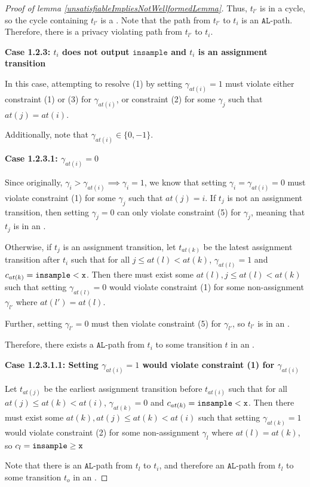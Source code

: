 \begin{proof}[Proof of lemma \ref{unsatisfiableImpliesNotWellformedLemma}]
    Thus, $t_{l'}$ is in a cycle, so the cycle containing $t_{l'}$ is a \gcycle. Note that the path from $t_{l'}$ to $t_i$ is an $\texttt{AL}$-path. Therefore, there is a privacy violating path from $t_{l'}$ to $t_i$.

    \textbf{Case 1.2.3: $t_i$ does not output $\texttt{insample}$ and $t_i$ is an assignment transition}

    In this case, attempting to resolve (1) by setting $\gamma_{at(i)} = 1$ must violate either constraint (1) or (3) for $\gamma_{at(i)}$, or constraint (2) for some $\gamma_j$ such that $at(j) = at(i)$. 

    Additionally, note that $\gamma_{at(i)} \in \{0, -1\}$. 

    \textbf{Case 1.2.3.1: $\gamma_{at(i)} =0$}

    Since originally, $\gamma_i > \gamma_{at(i)} \implies \gamma_i = 1$, we know that setting $\gamma_i = \gamma_{at(i)} = 0$ must violate constraint (1) for some $\gamma_j$ such that $at(j) = i$. If $t_{j}$ is not an assignment transition, then setting $\gamma_{j} = 0$ can only violate constraint (5) for $\gamma_{j}$, meaning that $t_j$ is in an \lcycle.

    Otherwise, if $t_j$ is an assignment transition, let $t_{at(k)}$ be the latest assignment transition after $t_{i}$ such that for all $j\leq at(l)< at(k)$, $\gamma_{at(l)} =1$ and $c_{at(k)} = \lguard[\texttt{x}]$. Then there must exist some $at(l), j\leq at(l)< at(k)$ such that setting $\gamma_{at(l)}=0$ would violate constraint (1) for some non-assignment $\gamma_{l'}$ where $at(l') = at(l)$. 

    Further, setting $\gamma_{l'} = 0$ must then violate constraint (5) for $\gamma_{l'}$, so $t_{l'}$ is in an \lcycle. 

    Therefore, there exists a $\texttt{AL}$-path from $t_i$ to some transition $t$ in an \lcycle. 

    \textbf{Case 1.2.3.1.1: Setting $\gamma_{at(i)} = 1$ would violate constraint (1) for $\gamma_{at(i)}$}

    Let $t_{at(j)}$ be the earliest assignment transition before $t_{at(i)}$ such that for all $at(j)\leq at(k)< at(i)$, $\gamma_{at(k)} =0$ and $c_{at(k)} = \lguard[\texttt{x}]$. Then there must exist some $at(k), at(j)\leq at(k)< at(i)$ such that setting $\gamma_{at(k)}=1$ would violate constraint (2) for some non-assignment $\gamma_l$ where $at(l) = at(k)$, so $c_l = \gguard[\texttt{x}]$

    Note that there is an $\texttt{AL}$-path from $t_l$ to $t_i$, and therefore an $\texttt{AL}$-path from $t_l$ to some transition $t_{o}$ in an \lcycle. 


\end{proof}
